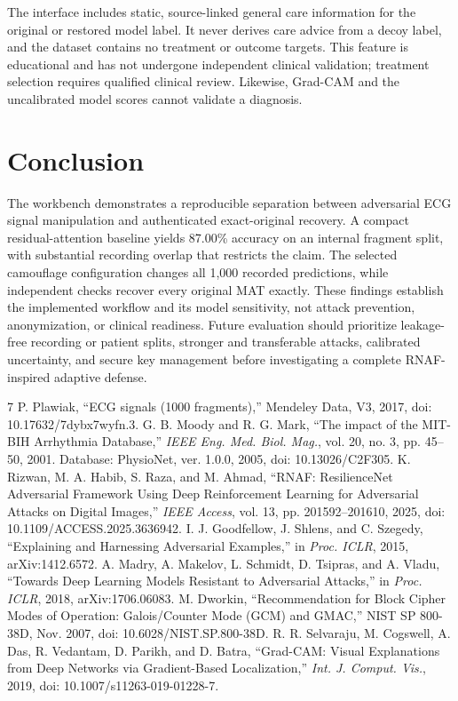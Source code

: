 \documentclass{jpp}
\begin{document}
The interface includes static, source-linked general care information for the original or restored model label. It never derives care advice from a decoy label, and the dataset contains no treatment or outcome targets. This feature is educational and has not undergone independent clinical validation; treatment selection requires qualified clinical review. Likewise, Grad-CAM and the uncalibrated model scores cannot validate a diagnosis.

\section{Conclusion}

The workbench demonstrates a reproducible separation between adversarial ECG signal manipulation and authenticated exact-original recovery. A compact residual-attention baseline yields 87.00\% accuracy on an internal fragment split, with substantial recording overlap that restricts the claim. The selected camouflage configuration changes all 1,000 recorded predictions, while independent checks recover every original MAT exactly. These findings establish the implemented workflow and its model sensitivity, not attack prevention, anonymization, or clinical readiness. Future evaluation should prioritize leakage-free recording or patient splits, stronger and transferable attacks, calibrated uncertainty, and secure key management before investigating a complete RNAF-inspired adaptive defense.

\begin{thebibliography}{7}
 P. Plawiak, ``ECG signals (1000 fragments),'' Mendeley Data, V3, 2017, doi: 10.17632/7dybx7wyfn.3.
 G. B. Moody and R. G. Mark, ``The impact of the MIT-BIH Arrhythmia Database,'' \textit{IEEE Eng. Med. Biol. Mag.}, vol. 20, no. 3, pp. 45--50, 2001. Database: PhysioNet, ver. 1.0.0, 2005, doi: 10.13026/C2F305.
 K. Rizwan, M. A. Habib, S. Raza, and M. Ahmad, ``RNAF: ResilienceNet Adversarial Framework Using Deep Reinforcement Learning for Adversarial Attacks on Digital Images,'' \textit{IEEE Access}, vol. 13, pp. 201592--201610, 2025, doi: 10.1109/ACCESS.2025.3636942.
 I. J. Goodfellow, J. Shlens, and C. Szegedy, ``Explaining and Harnessing Adversarial Examples,'' in \textit{Proc. ICLR}, 2015, arXiv:1412.6572.
 A. Madry, A. Makelov, L. Schmidt, D. Tsipras, and A. Vladu, ``Towards Deep Learning Models Resistant to Adversarial Attacks,'' in \textit{Proc. ICLR}, 2018, arXiv:1706.06083.
 M. Dworkin, ``Recommendation for Block Cipher Modes of Operation: Galois/Counter Mode (GCM) and GMAC,'' NIST SP 800-38D, Nov. 2007, doi: 10.6028/NIST.SP.800-38D.
 R. R. Selvaraju, M. Cogswell, A. Das, R. Vedantam, D. Parikh, and D. Batra, ``Grad-CAM: Visual Explanations from Deep Networks via Gradient-Based Localization,'' \textit{Int. J. Comput. Vis.}, 2019, doi: 10.1007/s11263-019-01228-7.
\end{thebibliography}
\end{document}
